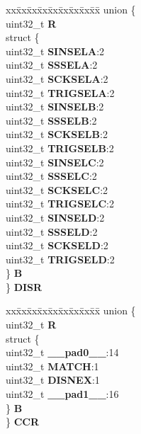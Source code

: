 \begin{DoxyCompactItemize}
\begin{tabbing}
\end{tabbing}\item 
\mbox{\label{structSIU__tag_ac4a79b5ce9ad021750c857ef4c5089ed}} 
\begin{tabbing}
xx\=xx\=xx\=xx\=xx\=xx\=xx\=xx\=xx\=\kill
union \{\\
\>uint32\_t {\bfseries R}\\
\>struct \{\\
\>\>uint32\_t {\bfseries SINSELA}:2\\
\>\>uint32\_t {\bfseries SSSELA}:2\\
\>\>uint32\_t {\bfseries SCKSELA}:2\\
\>\>uint32\_t {\bfseries TRIGSELA}:2\\
\>\>uint32\_t {\bfseries SINSELB}:2\\
\>\>uint32\_t {\bfseries SSSELB}:2\\
\>\>uint32\_t {\bfseries SCKSELB}:2\\
\>\>uint32\_t {\bfseries TRIGSELB}:2\\
\>\>uint32\_t {\bfseries SINSELC}:2\\
\>\>uint32\_t {\bfseries SSSELC}:2\\
\>\>uint32\_t {\bfseries SCKSELC}:2\\
\>\>uint32\_t {\bfseries TRIGSELC}:2\\
\>\>uint32\_t {\bfseries SINSELD}:2\\
\>\>uint32\_t {\bfseries SSSELD}:2\\
\>\>uint32\_t {\bfseries SCKSELD}:2\\
\>\>uint32\_t {\bfseries TRIGSELD}:2\\
\>\} {\bfseries B}\\
\} {\bfseries DISR}\\

\end{tabbing}\item 
\mbox{\label{structSIU__tag_a2a4625fe0ac00d1f55b5ec9080937e37}} 
\begin{tabbing}
xx\=xx\=xx\=xx\=xx\=xx\=xx\=xx\=xx\=\kill
union \{\\
\>uint32\_t {\bfseries R}\\
\>struct \{\\
\>\>uint32\_t {\bfseries \_\_pad0\_\_}:14\\
\>\>uint32\_t {\bfseries MATCH}:1\\
\>\>uint32\_t {\bfseries DISNEX}:1\\
\>\>uint32\_t {\bfseries \_\_pad1\_\_}:16\\
\>\} {\bfseries B}\\
\} {\bfseries CCR}\\


\end{tabbing}
\end{DoxyCompactItemize}
